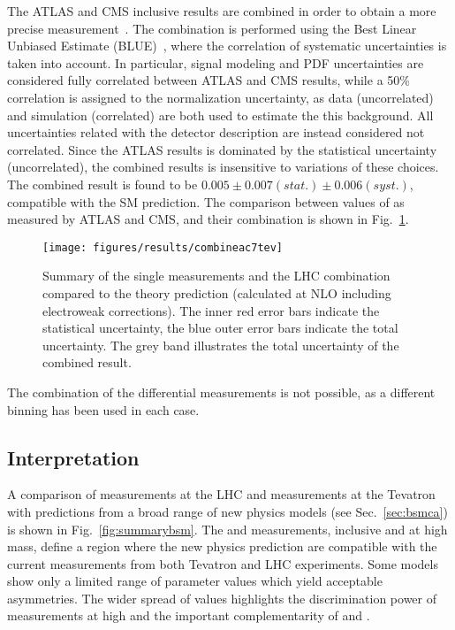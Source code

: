 The ATLAS and CMS inclusive \ac{} results are combined in order to
obtain a more precise measurement~\cite{ATLAS-CONF-2014-012}. The
combination is performed using the Best Linear Unbiased Estimate
(BLUE)~\cite{Lyons:1988rp,Valassi:2003mu}, where the correlation of
systematic uncertainties is taken into account. In particular, signal
modeling and PDF uncertainties are considered fully correlated between
ATLAS and CMS results, while a 50\% correlation is assigned to the
\wjets{} normalization uncertainty, as data (uncorrelated) and
simulation (correlated) are both used to estimate the this
background. All uncertainties related with the detector description
are instead considered not correlated. Since the ATLAS results is
dominated by the statistical uncertainty (uncorrelated), the combined
results is insensitive to variations of these choices. The combined
result is found to be $0.005\pm0.007(stat.)\pm0.006(syst.)$,
compatible with the SM prediction. The comparison between values of
\ac{} as measured by ATLAS and CMS, and their combination is shown in
Fig.~\ref{fig:combineac}.
\begin{figure}[!htb]\centering
  \texttt{[image: figures/results/combineac7tev]} 
  \caption{Summary of the single \ac{} measurements and the LHC
    combination compared to the theory prediction (calculated at NLO
    including electroweak corrections). The inner red error bars
    indicate the statistical uncertainty, the blue outer error bars
    indicate the total uncertainty. The grey band illustrates the
    total uncertainty of the combined result.} 
  \label{fig:combineac}
\end{figure}
The combination of the differential measurements is not possible, as a
different binning has been used in each case.

\subsection{Interpretation}

A comparison of \ac{} measurements at the LHC and \afb{} measurements
at the Tevatron with predictions from a broad range of new physics models
(see Sec.~\ref{sec:bsmca}) is shown in Fig.~\ref{fig:summarybsm}. The
\ac{} and \afb{} measurements, inclusive and at high \mtt{} mass,
define a region where the new physics prediction are compatible with
the current measurements from both Tevatron and LHC experiments.
Some models show only a limited range of parameter values which yield
acceptable asymmetries. The wider spread of \ac{} values highlights
the discrimination power of measurements at high \mtt{} and the
important complementarity of \ac{} and \afb{}. 

